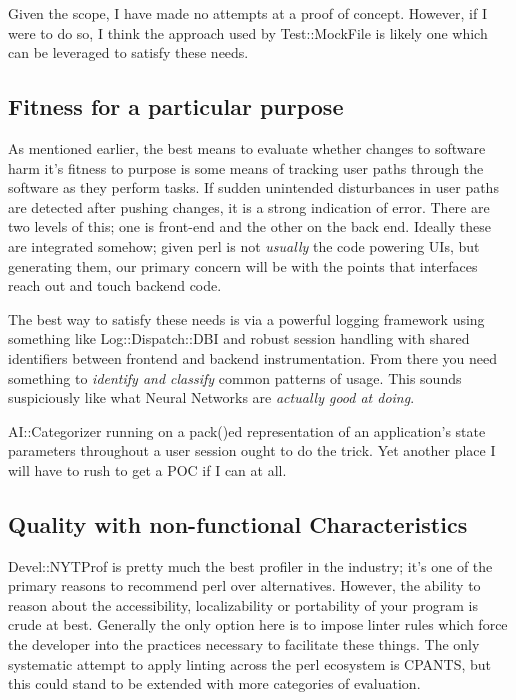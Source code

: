 \documentclass{article}
\begin{document}
Given the scope, I have made no attempts at a proof of concept.
However, if I were to do so, I think the approach used by Test::MockFile \cite{mf} is likely one which can be leveraged to satisfy these needs.

\subsection{Fitness for a particular purpose}

As mentioned earlier, the best means to evaluate whether changes to software harm it's fitness to purpose is some means of tracking user paths through the software as they perform tasks.
If sudden unintended disturbances in user paths are detected after pushing changes, it is a strong indication of error.
There are two levels of this; one is front-end and the other on the back end.
Ideally these are integrated somehow; given perl is not \textit{usually} the code powering UIs, but generating them, our primary concern will be with the points that interfaces reach out and touch backend code.

The best way to satisfy these needs is via a powerful logging framework using something like Log::Dispatch::DBI and robust session handling with shared identifiers between frontend and backend instrumentation.
From there you need something to \textit{identify and classify} common patterns of usage.
This sounds suspiciously like what Neural Networks are \textit{actually good at doing}.

AI::Categorizer running on a pack()ed representation of an application's state parameters throughout a user session ought to do the trick.
Yet another place I will have to rush to get a POC if I can at all.

\subsection{Quality with non-functional Characteristics}

Devel::NYTProf is pretty much the best profiler in the industry; it's one of the primary reasons to recommend perl over alternatives.
However, the ability to reason about the accessibility, localizability or portability of your program is crude at best.
Generally the only option here is to impose linter rules which force the developer into the practices necessary to facilitate these things.
The only systematic attempt to apply linting across the perl ecosystem is CPANTS, but this could stand to be extended with more categories of evaluation.
\end{document}
